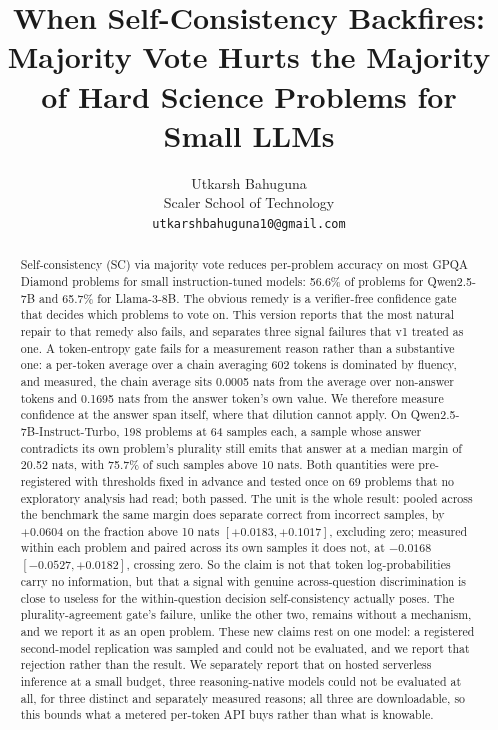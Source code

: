 \documentclass{article}
\title{When Self-Consistency Backfires: Majority Vote Hurts the Majority of Hard Science Problems for Small LLMs}
\author{Utkarsh Bahuguna \\
Scaler School of Technology \\
\texttt{utkarshbahuguna10@gmail.com}}
\begin{document}
\ifcolmsubmission
\linenumbers
\fi

\maketitle

\begin{abstract}
Self-consistency (SC) via majority vote reduces per-problem accuracy on most
GPQA Diamond problems for small instruction-tuned models: 56.6\% of problems
for Qwen2.5-7B and 65.7\% for Llama-3-8B. The obvious remedy is a
verifier-free confidence gate that decides which problems to vote on. This
version reports that the most natural repair to that remedy also fails, and
separates three signal failures that v1 treated as one. A token-entropy gate
fails for a measurement reason rather than a substantive one: a per-token
average over a chain averaging 602 tokens is dominated by fluency, and
measured, the chain average sits 0.0005 nats from the average over non-answer
tokens and 0.1695 nats from the answer token's own value. We therefore measure
confidence at the answer span itself, where that dilution cannot apply. On
Qwen2.5-7B-Instruct-Turbo, 198 problems at 64 samples each, a sample whose
answer contradicts its own problem's plurality still emits that answer at a
median margin of 20.52 nats, with 75.7\% of such samples above 10 nats. Both
quantities were pre-registered with thresholds fixed in advance and tested once
on 69 problems that no exploratory analysis had read; both passed. The unit is
the whole result: pooled across the benchmark the same margin does separate
correct from incorrect samples, by $+0.0604$ on the fraction above 10 nats
$[+0.0183, +0.1017]$, excluding zero; measured within each problem and paired
across its own samples it does not, at $-0.0168$ $[-0.0527, +0.0182]$, crossing
zero. So the claim is not that token log-probabilities carry no information,
but that a signal with genuine across-question discrimination is close to
useless for the within-question decision self-consistency actually poses. The
plurality-agreement gate's failure, unlike the other two, remains without a
mechanism, and we report it as an open problem. These new claims rest on one
model: a registered second-model replication was sampled and could not be
evaluated, and we report that rejection rather than the result. We separately
report that on hosted serverless inference at a small budget, three
reasoning-native models could not be evaluated at all, for three distinct and
separately measured reasons; all three are downloadable, so this bounds what a
metered per-token API buys rather than what is knowable.
\end{abstract}
\end{document}
